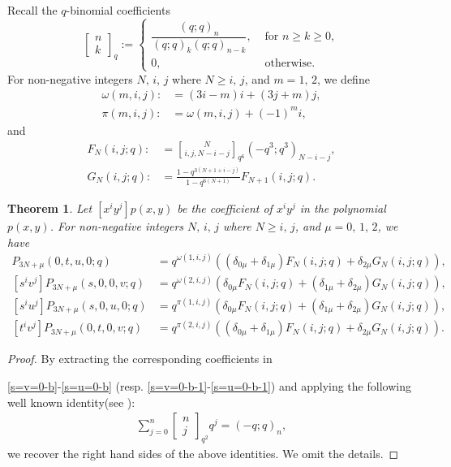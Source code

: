 \documentclass[12pt]{amsart}
\numberwithin{equation}{section}
\theoremstyle{plain}
\newtheorem{theorem}{Theorem}[section]
\theoremstyle{definition}
\newcommand\qbin[3]{\left[\begin{matrix} #1 \\ #2 \end{matrix} \right]_{#3}}
\begin{document}
Recall the $q$-binomial coefficients
 $$
\qbin{n}{k}{q} :=
\begin{cases}\dfrac{(q;q)_n}{(q;q)_k(q;q)_{n-k}}, & \text{ for } n\geq k\geq 0,\\ 0, & \text{ otherwise. }\end{cases}
$$
For non-negative integers $N,\, i,\,j$ where $N\geq i,\,j$, and $m=1,\,2$, we define 
\begin{align}
\omega(m,i,j):&=(3i-m)i+(3j+m)j,\\

\pi(m,i,j):&=\omega(m,i,j)+(-1)^{m}i,
\end{align}
and
\begin{align}
F_{N}(i,j; q):&={N\brack i, j,N-i-j}_{q^6} (-q^3;q^3)_{N-i-j},\\
G_{N}(i,j; q):&=\frac{1-q^{3(N+1+i- j)}}{1-q^{6(N+1)}}  F_{N+1}(i,j; q).
\end{align}
\begin{theorem} Let $[x^iy^j]p(x,y)$ be the coefficient of $x^iy^j$ in the polynomial $p(x,y)$. 
For non-negative integers $N,\, i,\,j$ where $N\geq i,\,j$, and $\mu=0, \,1,\,2$, we  have 
\begin{align}
[t^iu^j]P_{3N+\mu}(0,t,u,0;q)&=q^{\omega(1,i,j)}\left((\delta_{0\mu}+\delta_{1\mu}) F_{N}(i,j; q)+
\delta_{2\mu} G_{N}(i,j; q)\right), \label{coeff1}\\
[s^iv^j]P_{3N+\mu}(s,0,0,v;q)&=q^{\omega(2,i,j)}\left(\delta_{0\mu}F_{N}(i,j; q)+
(\delta_{1\mu}+\delta_{2\mu}) G_{N}(i,j; q)\right), \label{coeff2}\\
[s^iu^j]P_{3N+\mu}(s, 0,u,0;q)&=q^{\pi(1,i,j)}\left(\delta_{0\mu} F_{N}(i,j; q)+
(\delta_{1\mu}+\delta_{2\mu}) G_{N}(i,j; q)\right), \label{coeff3}\\
[t^iv^j]P_{3N+\mu}(0,t,0,v;q)&=q^{\pi(2,i,j)}\left((\delta_{0\mu}+\delta_{1\mu}) F_{N}(i,j; q)+
\delta_{2\mu} G_{N}(i,j; q)\right).\label{coeff4}
\end{align} 
\end{theorem}
\begin{proof}
By extracting the corresponding coefficients in 
 
\eqref{s=v=0-b}-\eqref{s=u=0-b} (resp. \eqref{s=v=0-b-1}-\eqref{s=u=0-b-1}) and applying the following well known identity(see \cite[Page 49]{andtp}):
\begin{align}\label{rogers}
\sum\limits_{j=0}^{n}\qbin{n}{j}{q^2}q^j=(-q;q)_n,
\end{align}
we recover the right hand sides of the above identities. We omit the details.
\end{proof}
\end{document}
